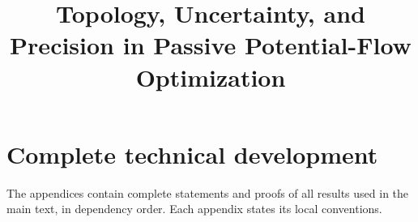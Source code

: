 \documentclass[11pt]{article}
\title{Topology, Uncertainty, and Precision in Passive Potential-Flow Optimization}
\author{}
\date{}
\begin{document}
\maketitle
\begin{abstract}

\end{abstract}








\clearpage


\clearpage
\appendix
\section*{Complete technical development}
The appendices contain complete statements and proofs of all results
used in the main text, in dependency order. Each appendix states its
local conventions.
\setcounter{tocdepth}{2}
\tableofcontents
\clearpage











\end{document}
